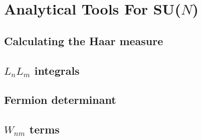 \chapter{Analytical Tools For SU(\texorpdfstring{$N$}{N})}

\section{Calculating the Haar measure}
\section{\texorpdfstring{$L_n L_m$}{Ln Lm} integrals}
\section{Fermion determinant}
\section{\texorpdfstring{$W_{nm}$}{Wnm} terms}
